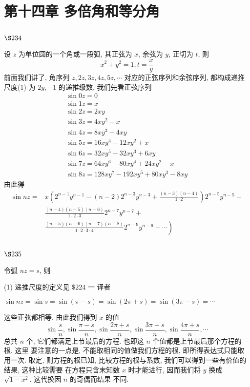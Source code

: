 \chapter{第十四章 多倍角和等分角}

\section{$\S 234$}

设 $z$ 为单位圆的一个角或一段弧, 其正弦为 $x$, 余弦为 $y$, 正切为 $t$, 则
\[
x^{2}+y^{2}=1, t=\frac{x}{y}
\]
前面我们讲了, 角序列 $z, 2 z, 3 z, 4 z, 5 z, \cdots$ 对应的正弦序列和余弦序列, 都构成递推尺度(1) 为 $2 y,-1$ 的递推级数, 我们先看正弦序列
\[
\begin{gathered}
\sin 0 z=0 \\
\sin 1 z=x \\
\sin 2 z=2 x y \\
\sin 3 z=4 x y^{2}-x \\
\sin 4 z=8 x y^{3}-4 x y \\
\sin 5 z=16 x y^{4}-12 x y^{2}+x \\
\sin 6 z=32 x y^{5}-32 x y^{3}+6 x y \\
\sin 7 z=64 x y^{6}-80 x y^{4}+24 x y^{2}-x \\
\sin 8 z=128 x y^{7}-192 x y^{5}+80 x y^{3}-8 x y
\end{gathered}
\]
由此得
\[
\begin{aligned}
\sin n z= & x\left(2^{n-1} y^{n-1}-(n-2) 2^{n-3} y^{n-3}+\frac{(n-3)(n-4)}{1 \cdot 2}\right) 2^{n-5} y^{n-5}- \\
& \frac{(n-4)(n-5)(n-6)}{1 \cdot 2 \cdot 3} 2^{n-7} y^{n-7}+ \\
& \left.\frac{(n-5)(n-6)(n-7)(n-8)}{1 \cdot 2 \cdot 3 \cdot 4} 2^{n-9} y^{n-9}-\cdots\right)
\end{aligned}
\]
\section{$\S 235$}

令弧 $n z=s$, 则

(1) 递推尺度的定义见 $\$ 224$ 一 译者 

$\sin n z=\sin s=\sin (\pi-s)=\sin (2 \pi+s)=\sin (3 \pi-s)=\cdots$

这些正弦都相等. 由此我们得到 $x$ 的值
\[
\sin \frac{s}{n}, \sin \frac{\pi-s}{n}, \sin \frac{2 \pi+s}{n}, \sin \frac{3 \pi-s}{n}, \sin \frac{4 \pi+s}{n}, \cdots
\]
总共 $n$ 个, 它们都满足上节最后的方程. 也即这 $n$ 个值都是上节最后那个方程的根. 这里 要注意的一点是, 不能取相同的值做我们方程的根, 即所得表达式只能取用一次. 取定, 则方程的根已知, 比较方程的根与系数, 我们可以得到一些有价值的结果, 这种比较需要 在方程只含末知数 $x$ 时才能进行, 因而我们将 $y$ 换成 $\sqrt{1-x^{2}}$. 这代换因 $n$ 的奇偶而结果 不同.


